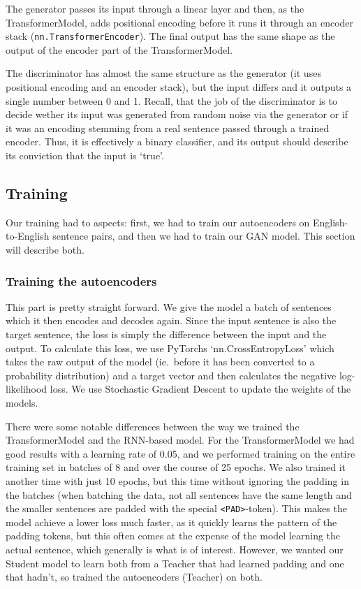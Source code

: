 \documentclass{article}
\begin{document}
The generator passes its input through a linear layer and then, as the
TransformerModel, adds positional encoding before it runs it through an encoder
stack (\texttt{nn.TransformerEncoder}). The final output has the same shape as
the output of the encoder part of the TransformerModel.

The discriminator has almost the same structure as the generator (it uses
positional encoding and an encoder stack), but the input differs and it outputs
a single number between 0 and 1. Recall, that the job of the discriminator is to
decide wether its input was generated from random noise via the generator or if
it was an encoding stemming from a real sentence passed through a trained
encoder. Thus, it is effectively a binary classifier, and its output should
describe its conviction that the input is `true'.

\subsection{Training}\label{sec:training}

Our training had to aspects: first, we had to train our autoencoders on
English-to-English sentence pairs, and then we had to train our GAN model. This
section will describe both.

\subsubsection{Training the autoencoders}

This part is pretty straight forward. We give the model a batch of sentences
which it then encodes and decodes again. Since the input sentence is also the
target sentence, the loss is simply the difference between the input and the
output. To calculate this loss, we use PyTorchs `nn.CrossEntropyLoss' which
takes the raw output of the model (ie.\ before it has been converted to a
probability distribution) and a target vector and then calculates the negative
log-likelihood loss. We use Stochastic Gradient Descent to update the weights of
the models.

There were some notable differences between the way we trained the
TransformerModel and the RNN-based model. For the TransformerModel we had good
results with a learning rate of 0.05, and we performed training on the entire
training set in batches of 8 and over the course of 25 epochs. We also trained
it another time with just 10 epochs, but this time without ignoring the padding
in the batches (when batching the data, not all sentences have the same length
and the smaller sentences are padded with the special \texttt{<PAD>}-token).
This makes the model achieve a lower loss much faster, as it quickly learns the
pattern of the padding tokens, but this often comes at the expense of the model
learning the actual sentence, which generally is what is of interest. However,
we wanted our Student model to learn both from a Teacher that had learned
padding and one that hadn't, so trained the autoencoders (Teacher) on both.
\end{document}
